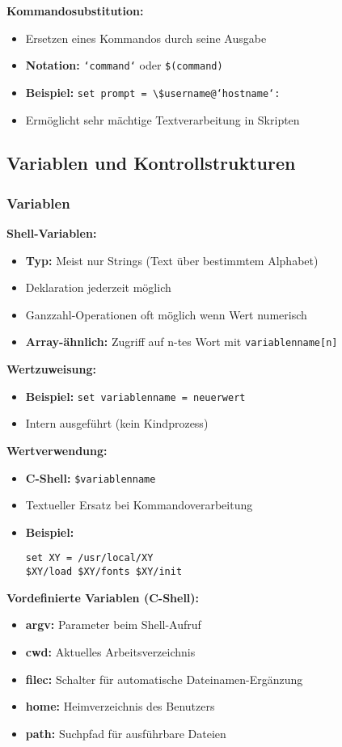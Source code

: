 \documentclass[9pt,a4paper]{extarticle}
\begin{document}
\begin{multicols*}{2}
\textbf{Kommandosubstitution:}
\begin{itemize}
\item Ersetzen eines Kommandos durch seine Ausgabe
\item \textbf{Notation:} \texttt{`command`} oder \texttt{\$(command)}
\item \textbf{Beispiel:} \texttt{set prompt = \textbackslash\$username@`hostname`:}
\item Ermöglicht sehr mächtige Textverarbeitung in Skripten
\end{itemize}

\subsection{Variablen und Kontrollstrukturen}
\subsubsection{Variablen}
\textbf{Shell-Variablen:}
\begin{itemize}
\item \textbf{Typ:} Meist nur Strings (Text über bestimmtem Alphabet)
\item Deklaration jederzeit möglich
\item Ganzzahl-Operationen oft möglich wenn Wert numerisch
\item \textbf{Array-ähnlich:} Zugriff auf n-tes Wort mit \texttt{variablenname[n]}
\end{itemize}

\textbf{Wertzuweisung:}
\begin{itemize}
\item \textbf{Beispiel:} \texttt{set variablenname = neuerwert}
\item Intern ausgeführt (kein Kindprozess)
\end{itemize}

\textbf{Wertverwendung:}
\begin{itemize}
\item \textbf{C-Shell:} \texttt{\$variablenname}
\item Textueller Ersatz bei Kommandoverarbeitung
\item \textbf{Beispiel:} 
\begin{verbatim}
set XY = /usr/local/XY
$XY/load $XY/fonts $XY/init
\end{verbatim}
\end{itemize}

\textbf{Vordefinierte Variablen (C-Shell):}
\begin{itemize}
\item \textbf{argv:} Parameter beim Shell-Aufruf
\item \textbf{cwd:} Aktuelles Arbeitsverzeichnis
\item \textbf{filec:} Schalter für automatische Dateinamen-Ergänzung
\item \textbf{home:} Heimverzeichnis des Benutzers
\item \textbf{path:} Suchpfad für ausführbare Dateien
\end{itemize}


\end{multicols*}
\end{document}
